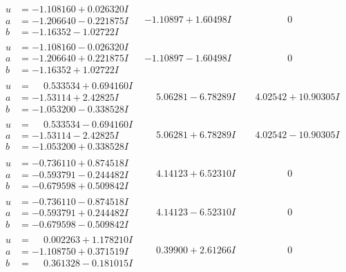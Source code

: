 \documentclass[1p]{elsarticle_modified}
\theoremstyle{definition}
\begin{document}
$$\begin{array}{c|c|c}
\begin{aligned}
u &= -1.108160 + 0.026320 I \\
a &= -1.206640 - 0.221875 I \\
b &= -1.16352 - 1.02722 I\end{aligned}
 & -1.10897 + 1.60498 I & \phantom{-0.000000 } 0 \\ \hline\begin{aligned}
u &= -1.108160 - 0.026320 I \\
a &= -1.206640 + 0.221875 I \\
b &= -1.16352 + 1.02722 I\end{aligned}
 & -1.10897 - 1.60498 I & \phantom{-0.000000 } 0 \\ \hline\begin{aligned}
u &= \phantom{-}0.533534 + 0.694160 I \\
a &= -1.53114 + 2.42825 I \\
b &= -1.053200 - 0.338528 I\end{aligned}
 & \phantom{-}5.06281 - 6.78289 I & \phantom{-}4.02542 + 10.90305 I \\ \hline\begin{aligned}
u &= \phantom{-}0.533534 - 0.694160 I \\
a &= -1.53114 - 2.42825 I \\
b &= -1.053200 + 0.338528 I\end{aligned}
 & \phantom{-}5.06281 + 6.78289 I & \phantom{-}4.02542 - 10.90305 I \\ \hline\begin{aligned}
u &= -0.736110 + 0.874518 I \\
a &= -0.593791 - 0.244482 I \\
b &= -0.679598 + 0.509842 I\end{aligned}
 & \phantom{-}4.14123 + 6.52310 I & \phantom{-0.000000 } 0 \\ \hline\begin{aligned}
u &= -0.736110 - 0.874518 I \\
a &= -0.593791 + 0.244482 I \\
b &= -0.679598 - 0.509842 I\end{aligned}
 & \phantom{-}4.14123 - 6.52310 I & \phantom{-0.000000 } 0 \\ \hline\begin{aligned}
u &= \phantom{-}0.002263 + 1.178210 I \\
a &= -1.108750 + 0.371519 I \\
b &= \phantom{-}0.361328 - 0.181015 I\end{aligned}
 & \phantom{-}0.39900 + 2.61266 I & \phantom{-0.000000 } 0 \\ \hline\begin{aligned}

\end{aligned}
\end{array}$$
\end{document}
